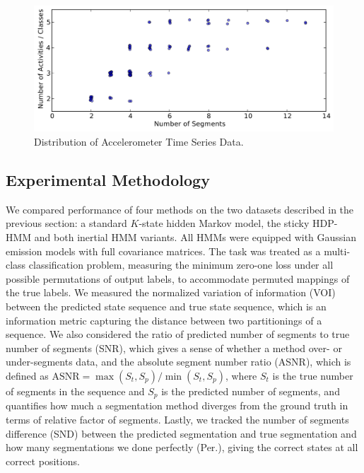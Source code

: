 \documentclass[letterpaper]{article}
\begin{document}
\begin{figure}[htbp]
\setlength{\floatsep}{0cm}
\setlength{\abovecaptionskip}{0pt}
\setlength{\belowcaptionskip}{0cm}
  \centering
    \includegraphics[width=1.\linewidth]{images/distribution_of_dataset_segments.pdf}
    \caption{\small{Distribution of Accelerometer Time Series Data.}}
  \label{fig:distribution}
\end{figure}

\subsection{Experimental Methodology}

We compared performance of four methods on the two datasets described in the previous
section: a standard $K$-state hidden Markov model, the sticky HDP-HMM and both inertial HMM variants. All HMMs were equipped with Gaussian emission models with full covariance matrices.
The task was treated as a multi-class classification problem, measuring the minimum
zero-one loss under all possible permutations of output labels, to accommodate
permuted mappings of the true labels. We measured the normalized variation of 
information (VOI)~\cite{meila} between the predicted state sequence and true state sequence, 
which is an information metric capturing the distance between two
partitionings of a sequence. We also considered the ratio of predicted number of segments 
to true number of segments (SNR), which gives a sense of whether a method over- or under-segments data, and the
absolute segment number ratio (ASNR), which is defined as
$\text{ASNR} = \max(S_t, S_p)/\min(S_t, S_p)$, 
where $S_t$ is the true number of segments in the sequence and $S_p$ is the predicted number of segments, and quantifies how much a segmentation method diverges from the ground truth in terms of relative factor of segments. Lastly, we tracked the number of segments difference (SND) between the predicted segmentation and true segmentation and how many segmentations we done perfectly (Per.), giving the correct states at all correct positions.
\end{document}
